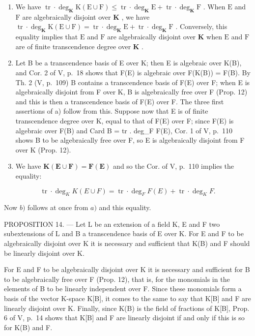 \begin{enumerate}
\def\labelenumi{\alph{enumi})}
\setcounter{enumi}{1}
\item
  We have \(\operatorname{tr} \cdot \deg_{\mathbf{K}} \mathrm{K}(\mathrm{E} \cup \mathrm{F}) \leqslant \operatorname{tr} \cdot \deg_{\mathbf{K}} \mathrm{E} + \operatorname{tr} \cdot \deg_{\mathbf{K}} \mathrm{F}\) . When \(\mathrm{E}\) and \(\mathrm{F}\) are algebraically disjoint over \(\mathbf{K}\) , we have \(\operatorname{tr} \cdot \deg_{\mathbf{K}} \mathrm{K}(\mathrm{E} \cup \mathrm{F}) = \operatorname{tr} \cdot \deg_{\mathbf{K}} \mathrm{E} + \operatorname{tr} \cdot \deg_{\mathbf{K}} \mathrm{F}\) . Conversely, this equality implies that \(\mathrm{E}\) and \(\mathrm{F}\) are algebraically disjoint over \(\mathbf{K}\) when \(\mathrm{E}\) and \(\mathrm{F}\) are of finite transcendence degree over \(\mathbf{K}\) .
\item
  Let B be a transcendence basis of E over K; then E is algebraic over K(B), and Cor. 2 of V, p.~18 shows that F(E) is algebraic over F(K(B)) = F(B). By Th. 2 (V, p.~109) B contains a transcendence basis of F(E) over F; when E is algebraically disjoint from F over K, B is algebraically free over F (Prop. 12) and this is then a transcendence basis of F(E) over F. The three first assertions of a) follow from this. Suppose now that E is of finite transcendence degree over K, equal to that of F(E) over F; since F(E) is algebraic over F(B) and Card B = tr . deg\_F F(E), Cor. 1 of V, p.~110 shows B to be algebraically free over F, so E is algebraically disjoint from F over K (Prop. 12).
\item
  We have \(\mathbf{K}(\mathbf{E} \cup \mathbf{F}) = \mathbf{F}(\mathbf{E})\) and so the Cor. of V, p.~110 implies the equality:
\end{enumerate}

\[
\operatorname{tr} \cdot \deg_ {K} K (E \cup F) = \operatorname{tr} \cdot \deg_ {F} F (E) + \operatorname{tr} \cdot \deg_ {K} F.
\]

Now \(b)\) follows at once from \(a)\) and this equality.

PROPOSITION 14. --- Let L be an extension of a field K, E and F two subextensions of L and B a transcendence basis of E over K. For E and F to be algebraically disjoint over K it is necessary and sufficient that K(B) and F should be linearly disjoint over K.

For E and F to be algebraically disjoint over K it is necessary and sufficient for B to be algebraically free over F (Prop. 12), that is, for the monomials in the elements of B to be linearly independent over F. Since these monomials form a basis of the vector K-space K{[}B{]}, it comes to the same to say that K{[}B{]} and F are linearly disjoint over K. Finally, since K(B) is the field of fractions of K{[}B{]}, Prop. 6 of V, p.~14 shows that K{[}B{]} and F are linearly disjoint if and only if this is so for K(B) and F.


